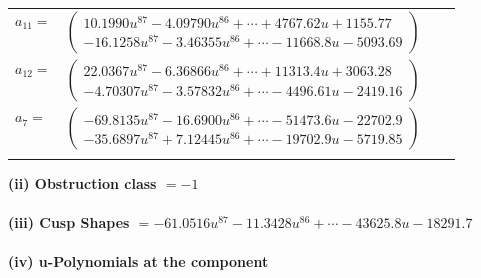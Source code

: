 \documentclass[1p]{elsarticle_modified}
\theoremstyle{definition}
\begin{document}
\begin{tabular}{m{7pt} m{180pt} m{7pt} m{180pt} }
\flushright $a_{11}=$&$\begin{pmatrix}10.1990 u^{87}-4.09790 u^{86}+\cdots+4767.62 u+1155.77\\-16.1258 u^{87}-3.46355 u^{86}+\cdots-11668.8 u-5093.69\end{pmatrix}$ \\
\flushright $a_{12}=$&$\begin{pmatrix}22.0367 u^{87}-6.36866 u^{86}+\cdots+11313.4 u+3063.28\\-4.70307 u^{87}-3.57832 u^{86}+\cdots-4496.61 u-2419.16\end{pmatrix}$ \\
\flushright $a_{7}=$&$\begin{pmatrix}-69.8135 u^{87}-16.6900 u^{86}+\cdots-51473.6 u-22702.9\\-35.6897 u^{87}+7.12445 u^{86}+\cdots-19702.9 u-5719.85\end{pmatrix}$\\&\end{tabular}
\flushleft \textbf{(ii) Obstruction class $= -1$}\\~\\
\flushleft \textbf{(iii) Cusp Shapes $= -61.0516 u^{87}-11.3428 u^{86}+\cdots-43625.8 u-18291.7$}\\~\\
\newpage\renewcommand{\arraystretch}{1}
\flushleft \textbf{(iv) u-Polynomials at the component}\newline \\
\end{document}
